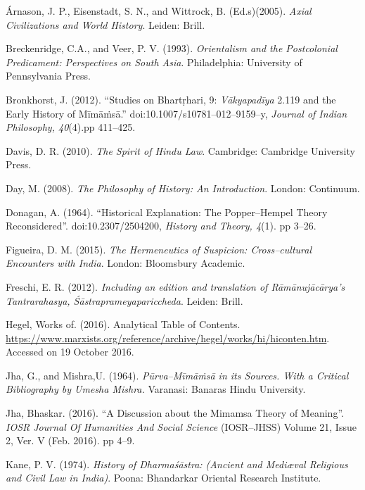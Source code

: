 \begin{thebibliography}{99}
 Árnason, J. P., Eisenstadt, S. N., and Wittrock, B. (Ed.s)(2005). \textit{Axial Civilizations and World History}. Leiden: Brill.

  Breckenridge, C.A., and Veer, P. V. (1993). \textit{Orientalism and the Postcolonial Predicament: Perspectives on South Asia}. Philadelphia: University of Pennsylvania Press.

  Bronkhorst, J. (2012). “Studies on Bhartṛhari, 9: \textit{Vākyapadīya} 2.119 and the Early History of Mīmāṁsā.” doi:10.1007/s10781–012–9159–y, \textit{Journal of Indian Philosophy, 40}(4).pp 411–425.

  Davis, D. R. (2010). \textit{The Spirit of Hindu Law}. Cambridge: Cambridge University Press.

  Day, M. (2008). \textit{The Philosophy of History: An Introduction}. London: Continuum.

  Donagan, A. (1964). “Historical Explanation: The Popper–Hempel Theory Reconsidered”. doi:10.2307/2504200, \textit{History and Theory, 4}(1). pp 3–26.

  Figueira, D. M. (2015). \textit{The Hermeneutics of Suspicion: Cross–cultural Encounters with India}. London: Bloomsbury Academic.

  Freschi, E. R. (2012). \textit{Including an edition and translation of Rāmānujācārya's Tantrarahasya, Śāstraprameyapariccheda}. Leiden: Brill.

  Hegel, Works of. (2016). Analytical Table of Contents. \url{https://www.marxists.org/reference/archive/hegel/works/hi/hiconten.htm}. Accessed on 19 October 2016.

  Jha, G., and Mishra,U. (1964). \textit{Pūrva–Mīmāṁsā in its Sources. With a Critical Bibliography by Umesha Mishra.} Varanasi: Banaras Hindu University.

  Jha, Bhaskar. (2016). “A Discussion about the Mimamsa Theory of Meaning”. \textit{IOSR Journal Of Humanities And Social Science} (IOSR–JHSS) Volume 21, Issue 2, Ver. V (Feb. 2016). pp 4–9.

  Kane, P. V. (1974). \textit{History of Dharmaśāstra: (Ancient and Mediæval Religious and Civil Law in India)}. Poona: Bhandarkar Oriental Research Institute.


\end{thebibliography}
